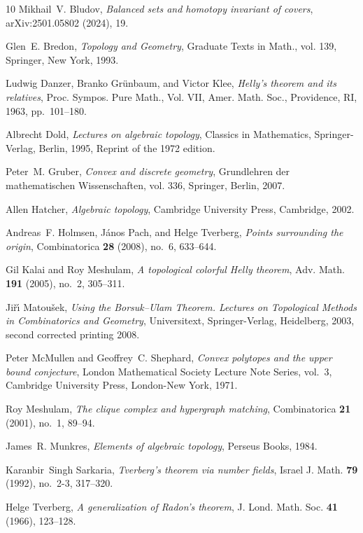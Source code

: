 \documentclass[a4paper,11pt,reqno, english]{amsart}
\theoremstyle{definition}
\theoremstyle{remark}
\begin{document}
\begin{thebibliography}{10}
Mikhail~V. Bludov, \emph{{Balanced sets and homotopy invariant of covers}},
  arXiv:2501.05802 (2024), 19.

Glen~E. Bredon, \emph{Topology and {G}eometry}, Graduate Texts in Math., vol.
  139, Springer, New York, 1993.

Ludwig Danzer, Branko Gr\"{u}nbaum, and Victor Klee, \emph{Helly's theorem and
  its relatives}, Proc. {S}ympos. {P}ure {M}ath., {V}ol. {VII}, Amer. Math.
  Soc., Providence, RI, 1963, pp.~101--180.

Albrecht Dold, \emph{Lectures on algebraic topology}, Classics in Mathematics,
  Springer-Verlag, Berlin, 1995, Reprint of the 1972 edition.

Peter~M. Gruber, \emph{Convex and discrete geometry}, Grundlehren der
  mathematischen Wissenschaften, vol. 336, Springer, Berlin, 2007.

Allen Hatcher, \emph{Algebraic topology}, Cambridge University Press,
  Cambridge, 2002.

Andreas~F. Holmsen, J\'anos Pach, and Helge Tverberg, \emph{Points surrounding
  the origin}, Combinatorica \textbf{28} (2008), no.~6, 633--644.

Gil Kalai and Roy Meshulam, \emph{A topological colorful {H}elly theorem}, Adv.
  Math. \textbf{191} (2005), no.~2, 305--311.

Ji\v{r}\'{\i} Matou\v{s}ek, \emph{{Using the {Borsuk--Ulam} Theorem. {L}ectures
  on Topological Methods in Combinatorics and Geometry}}, Universitext,
  Springer-Verlag, Heidelberg, 2003, second corrected printing 2008.

Peter McMullen and Geoffrey~C. Shephard, \emph{Convex polytopes and the upper
  bound conjecture}, London Mathematical Society Lecture Note Series, vol.~3,
  Cambridge University Press, London-New York, 1971.

Roy Meshulam, \emph{The clique complex and hypergraph matching}, Combinatorica
  \textbf{21} (2001), no.~1, 89--94.

James~R. Munkres, \emph{Elements of algebraic topology}, Perseus Books, 1984.

Karanbir~Singh Sarkaria, \emph{Tverberg's theorem via number fields}, Israel J.
  Math. \textbf{79} (1992), no.~2-3, 317--320.

Helge Tverberg, \emph{A generalization of {R}adon's theorem}, J. Lond. Math.
  Soc. \textbf{41} (1966), 123--128.

\end{thebibliography}
\end{document}
